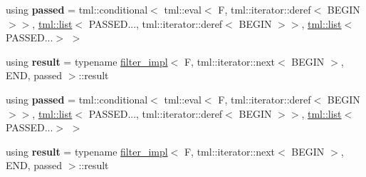\begin{DoxyCompactItemize}
\item 
\hypertarget{structtml_1_1impl_1_1filter__impl_3_01F_00_01BEGIN_00_01END_00_01tml_1_1list_3_01PASSED_8_8_8_4_01_4_aeb14aecd81be2a61c7bbbf9eede14299}{using {\bfseries passed} = tml\+::conditional$<$ tml\+::eval$<$ F, tml\+::iterator\+::deref$<$ B\+E\+G\+I\+N $>$$>$, \hyperlink{structtml_1_1list}{tml\+::list}$<$ P\+A\+S\+S\+E\+D..., tml\+::iterator\+::deref$<$ B\+E\+G\+I\+N $>$$>$, \hyperlink{structtml_1_1list}{tml\+::list}$<$ P\+A\+S\+S\+E\+D...$>$ $>$}\label{structtml_1_1impl_1_1filter__impl_3_01F_00_01BEGIN_00_01END_00_01tml_1_1list_3_01PASSED_8_8_8_4_01_4_aeb14aecd81be2a61c7bbbf9eede14299}

\item 
\hypertarget{structtml_1_1impl_1_1filter__impl_3_01F_00_01BEGIN_00_01END_00_01tml_1_1list_3_01PASSED_8_8_8_4_01_4_a9852e7be3d8365645c3b9a84aa9f3db2}{using {\bfseries result} = typename \hyperlink{structtml_1_1impl_1_1filter__impl}{filter\+\_\+impl}$<$ F, tml\+::iterator\+::next$<$ B\+E\+G\+I\+N $>$, E\+N\+D, passed $>$\+::result}\label{structtml_1_1impl_1_1filter__impl_3_01F_00_01BEGIN_00_01END_00_01tml_1_1list_3_01PASSED_8_8_8_4_01_4_a9852e7be3d8365645c3b9a84aa9f3db2}

\item 
\hypertarget{structtml_1_1impl_1_1filter__impl_3_01F_00_01BEGIN_00_01END_00_01tml_1_1list_3_01PASSED_8_8_8_4_01_4_aeb14aecd81be2a61c7bbbf9eede14299}{using {\bfseries passed} = tml\+::conditional$<$ tml\+::eval$<$ F, tml\+::iterator\+::deref$<$ B\+E\+G\+I\+N $>$$>$, \hyperlink{structtml_1_1list}{tml\+::list}$<$ P\+A\+S\+S\+E\+D..., tml\+::iterator\+::deref$<$ B\+E\+G\+I\+N $>$$>$, \hyperlink{structtml_1_1list}{tml\+::list}$<$ P\+A\+S\+S\+E\+D...$>$ $>$}\label{structtml_1_1impl_1_1filter__impl_3_01F_00_01BEGIN_00_01END_00_01tml_1_1list_3_01PASSED_8_8_8_4_01_4_aeb14aecd81be2a61c7bbbf9eede14299}

\item 
\hypertarget{structtml_1_1impl_1_1filter__impl_3_01F_00_01BEGIN_00_01END_00_01tml_1_1list_3_01PASSED_8_8_8_4_01_4_a9852e7be3d8365645c3b9a84aa9f3db2}{using {\bfseries result} = typename \hyperlink{structtml_1_1impl_1_1filter__impl}{filter\+\_\+impl}$<$ F, tml\+::iterator\+::next$<$ B\+E\+G\+I\+N $>$, E\+N\+D, passed $>$\+::result}\label{structtml_1_1impl_1_1filter__impl_3_01F_00_01BEGIN_00_01END_00_01tml_1_1list_3_01PASSED_8_8_8_4_01_4_a9852e7be3d8365645c3b9a84aa9f3db2}

\end{DoxyCompactItemize}
